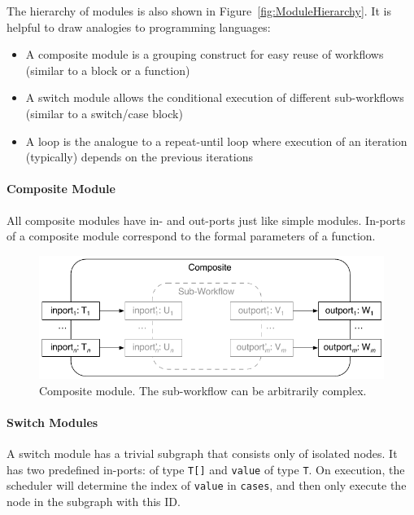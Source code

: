 The hierarchy of modules is also shown in Figure~\ref{fig:ModuleHierarchy}. It is helpful to draw analogies to programming languages:
%
\begin{itemize}
	\item A composite module is a grouping construct for easy reuse of workflows (similar to a block or a function)
	\item A switch module allows the conditional execution of different sub-workflows (similar to a switch/case block)
	\item A loop is the analogue to a repeat-until loop where execution of an iteration (typically) depends on the previous iterations
\end{itemize}

\paragraph{Composite Module}

All composite modules have in- and out-ports just like simple modules. In-ports of a composite module correspond to the formal parameters of a function.

\begin{figure}
	\centering
	\includegraphics{workflows/composite-module}
	\caption{Composite module. The sub-workflow can be arbitrarily complex.\label{fig:CompositeModule}}
\end{figure}

\paragraph{Switch Modules}

A switch module has a trivial subgraph that consists only of isolated nodes. It has two predefined in-ports:  of type \texttt{T[]} and \texttt{value} of type \texttt{T}. On execution, the scheduler will determine the index of \texttt{value} in \texttt{cases}, and then only execute the node in the subgraph with this ID.

